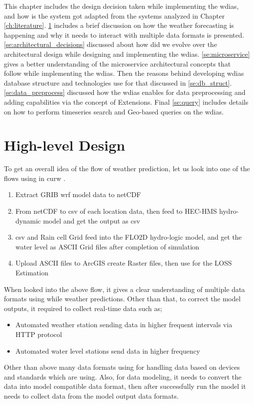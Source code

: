 This chapter includes the design decision taken while implementing the \acrfull{wdias}, and how is the system got adapted from the systems analyzed in Chapter \ref{ch:literature}.
\cref{se:high_level_design} includes a brief discussion on how the weather forecasting is happening and why it needs to interact with multiple data formats is presented.
\cref{se:architectural_decisions} discussed about how did we evolve over the architectural design while designing and implementing the \acrshort{wdias}.
\cref{se:microservice} gives a better understanding of the microservice architectural concepts that follow while implementing the \acrshort{wdias}.
Then the reasons behind developing \acrshort{wdias} database structure and technologies use for that discussed in \cref{se:db_struct}.
\cref{se:data_preprocess} discussed how the \acrshort{wdias} enables for data preprocessing and adding capabilities via the concept of Extensions.
Final \cref{se:query} includes details on how to perform timeseries search and Geo-based queries on the \acrshort{wdias}.

\section{High-level Design}
\label{se:high_level_design}

To get an overall idea of the flow of weather prediction, let us look into one of the flows using in \acrshort{curw} \cite{CUrWSL2017SL}.

\begin{enumerate}
    \item Extract \acrshort{GRIB} \acrshort{wrf} model data to \acrshort{netCDF}
    \item From \acrshort{netCDF} to \acrshort{csv} of each location data, then feed to HEC-HMS hydro-dynamic model and get the output as \acrshort{csv}
    \item \acrshort{csv} and Rain cell Grid feed into the FLO2D hydro-logic model, and get the water level as ASCII Grid files after completion of simulation
    \item Upload ASCII files to ArcGIS create Raster files, then use for the LOSS Estimation
\end{enumerate}
When looked into the above flow, it gives a clear understanding of multiple data formats using while weather predictions.
Other than that, to correct the model outputs, it required to collect real-time data such as;
\begin{itemize}
    \item Automated weather station sending data in higher frequent intervals via HTTP protocol
    \item Automated water level stations send data in higher frequency
\end{itemize}
Other than above many data formats using for handling data based on devices and standards which are using. Also, for data modeling, it needs to convert the data into model compatible data format, then after successfully run the model it needs to collect data from the model output data formats.

